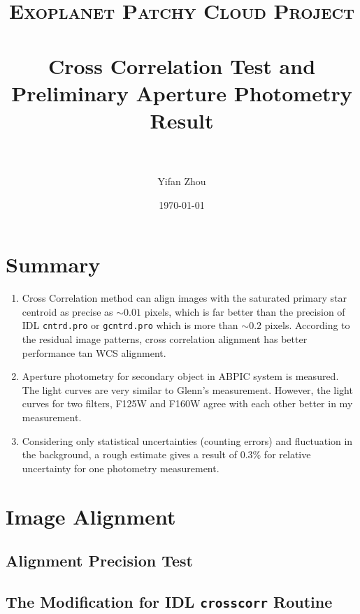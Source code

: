 \documentclass[paper=letter, fontsize=11pt]{scrartcl} %
\title{ 
\normalfont \normalsize 
\textsc{Exoplanet Patchy Cloud Project} \\ [25pt] %
\horrule{0.5pt} \\[0.4cm] %
\huge Cross Correlation Test and Preliminary Aperture Photometry Result\\ %
\horrule{2pt} \\[0.5cm] %
}
\author{Yifan Zhou} %
\date{\normalsize\today} %
\numberwithin{equation}{section} %
\numberwithin{figure}{section} %
\numberwithin{table}{section} %
\begin{document}
\maketitle %
\section{Summary}
\begin{enumerate}
\item Cross Correlation method can align images with the saturated
  primary star centroid as precise as $\sim 0.01$ pixels, which is far
  better than the precision of IDL \texttt{cntrd.pro} or
  \texttt{gcntrd.pro} which is more than $\sim 0.2$ pixels. According
  to the residual image patterns, cross correlation alignment has
  better performance tan WCS alignment.
\item Aperture photometry for secondary object in ABPIC system is
  measured. The light curves are very similar to Glenn's
  measurement. However, the light curves for two filters, F125W and
  F160W agree with each other better in my measurement.
\item Considering only statistical uncertainties (counting errors) and
  fluctuation in the background, a rough estimate gives a result of
  0.3\% for relative uncertainty for one
  photometry measurement.
  
\end{enumerate}
\section{Image Alignment}
\subsection{Alignment Precision Test}
\subsection{The Modification for IDL \texttt{crosscorr} Routine}
\end{document}
